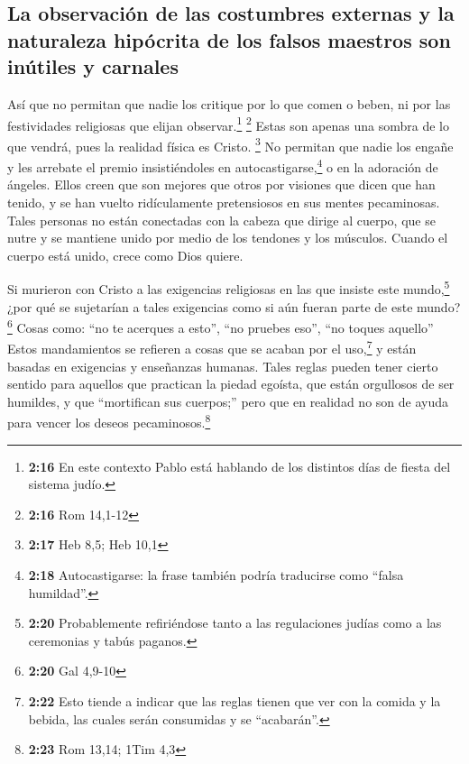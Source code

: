 \hypertarget{la-observaciuxf3n-de-las-costumbres-externas-y-la-naturaleza-hipuxf3crita-de-los-falsos-maestros-son-inuxfatiles-y-carnales}{%
\subsection{La observación de las costumbres externas y la naturaleza
hipócrita de los falsos maestros son inútiles y
carnales}\label{la-observaciuxf3n-de-las-costumbres-externas-y-la-naturaleza-hipuxf3crita-de-los-falsos-maestros-son-inuxfatiles-y-carnales}}

 Así que no permitan que nadie los critique por lo que
comen o beben, ni por las festividades religiosas que elijan
observar.\footnote{\textbf{2:16} En este contexto Pablo está hablando de
  los distintos días de fiesta del sistema judío.} \footnote{\textbf{2:16}
  Rom 14,1-12}  Estas son apenas una sombra de lo que
vendrá, pues la realidad física es Cristo. \footnote{\textbf{2:17} Heb
  8,5; Heb 10,1}  No permitan que nadie los engañe y les
arrebate el premio insistiéndoles en autocastigarse,\footnote{\textbf{2:18}
  Autocastigarse: la frase también podría traducirse como ``falsa
  humildad''.} o en la adoración de ángeles. Ellos creen que son mejores
que otros por visiones que dicen que han tenido, y se han vuelto
ridículamente pretensiosos en sus mentes pecaminosas. 
Tales personas no están conectadas con la cabeza que dirige al cuerpo,
que se nutre y se mantiene unido por medio de los tendones y los
músculos. Cuando el cuerpo está unido, crece como Dios quiere.

 Si murieron con Cristo a las exigencias religiosas en
las que insiste este mundo,\footnote{\textbf{2:20} Probablemente
  refiriéndose tanto a las regulaciones judías como a las ceremonias y
  tabús paganos.} ¿por qué se sujetarían a tales exigencias como si aún
fueran parte de este mundo? \footnote{\textbf{2:20} Gal 4,9-10}
 Cosas como: ``no te acerques a esto'', ``no pruebes
eso'', ``no toques aquello''  Estos mandamientos se
refieren a cosas que se acaban por el uso,\footnote{\textbf{2:22} Esto
  tiende a indicar que las reglas tienen que ver con la comida y la
  bebida, las cuales serán consumidas y se ``acabarán''.} y están
basadas en exigencias y enseñanzas humanas.  Tales reglas
pueden tener cierto sentido para aquellos que practican la piedad
egoísta, que están orgullosos de ser humildes, y que ``mortifican sus
cuerpos;'' pero que en realidad no son de ayuda para vencer los deseos
pecaminosos.\footnote{\textbf{2:23} Rom 13,14; 1Tim 4,3}

